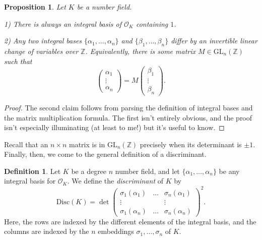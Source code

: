 \documentclass[12pt]{amsart}
\newtheorem{proposition}[theorem]{Proposition}
\theoremstyle{definition} \newtheorem*{notation}{Notation}
\theoremstyle{remark} \newtheorem*{remark}{Remark}
\theoremstyle{remark} \newtheorem*{example}{Example}
\theoremstyle{definition} \newtheorem*{definition}{Definition}
\numberwithin{equation}{section}
\numberwithin{theorem}{section}
\begin{document}
	\begin{proposition} \label{prop:integral-basis}
		Let $K$ be a number field.
		
		1) There is always an integral basis of $\mathcal{O}_K$ containing $1$.
		
		2)  Any two integral bases $\{\alpha_1,\dots,\alpha_n\}$ and $\{\beta_1,\dots,\beta_n\}$ differ by an invertible linear change of variables over $\mathbb{Z}$.  Equivalently, there is some matrix $M \in \mathrm{GL}_n(\mathbb{Z})$ such that 
			\[
				\begin{pmatrix} \alpha_1 \\ \vdots \\ \alpha_n \end{pmatrix} = M \begin{pmatrix} \beta_1 \\ \vdots \\ \beta_n\end{pmatrix}.
			\]
	\end{proposition}
	\begin{proof}
		The second claim follows from parsing the definition of integral bases and the matrix multiplication formula.  The first isn't entirely obvious, and the proof isn't especially illuminating (at least to me!) but it's useful to know.
	\end{proof}
	
	Recall that an $n\times n$ matrix is in $\mathrm{GL}_n(\mathbb{Z})$ precisely when its determinant is $\pm 1$.  Finally, then, we come to the general definition of a discriminant.
	
	\begin{definition}
		Let $K$ be a degree $n$ number field, and let $\{\alpha_1,\dots,\alpha_n\}$ be any integral basis for $\mathcal{O}_K$.  We define the \emph{discriminant} of $K$ by
			\[
				\mathrm{Disc}(K) = \det\begin{pmatrix}
					\sigma_1(\alpha_1) & \dots & \sigma_n(\alpha_1) \\
					\vdots & & \vdots \\
					\sigma_1(\alpha_n) & \dots & \sigma_n(\alpha_n)
				\end{pmatrix}^2.
			\]
		Here, the rows are indexed by the different elements of the integral basis, and the columns are indexed by the $n$ embeddings $\sigma_1,\dots,\sigma_n$ of $K$.
	\end{definition}
\end{document}
